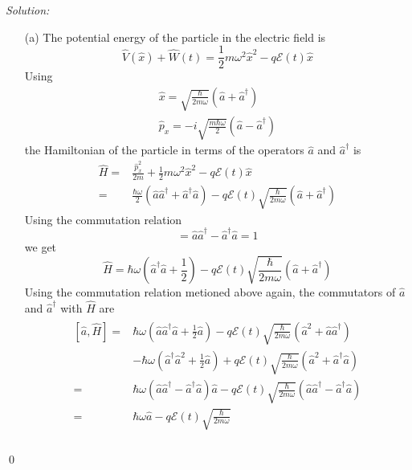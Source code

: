 \documentclass[12pt,a4paper]{article}
\newenvironment{sol}
    {\emph{Solution:}
    }
    {
    \qed
    }
\begin{document}
\begin{sol}
\begin{itemize}
\item[(a)] The potential energy of the particle in the electric field is
\begin{equation}
\hat{V}(\hat{x})+\hat{W}(t)=\frac{1}{2}m\omega^2\hat{x}^2-q\mathcal{E}(t)\hat{x}
\end{equation}
Using
\begin{gather}
\hat{x}=\sqrt{\frac{\hbar}{2m\omega}}(\hat{a}+\hat{a}^{\dagger})\\
\hat{p}_x=-i\sqrt{\frac{m\hbar\omega}{2}}(\hat{a}-\hat{a}^{\dagger})
\end{gather}
the Hamiltonian of the particle in terms of the operators $\hat{a}$ and $\hat{a}^{\dagger}$ is
\begin{align}
\nonumber\hat{H}=&\frac{\hat{p}_x^2}{2m}+\frac{1}{2}m\omega^2\hat{x}^2-q\mathcal{E}(t)\hat{x}\\
=&\frac{\hbar\omega}{2}(\hat{a}\hat{a}^{\dagger}+\hat{a}^{\dagger}\hat{a})-q\mathcal{E}(t)\sqrt{\frac{\hbar}{2m\omega}}(\hat{a}+\hat{a}^{\dagger})
\end{align}
Using the commutation relation
\begin{equation}
[\hat{a},\hat{a}^{\dagger}]=\hat{a}\hat{a}^{\dagger}-\hat{a}^{\dagger}\hat{a}=1
\end{equation}
we get
\begin{equation}
\hat{H}=\hbar\omega(\hat{a}^{\dagger}\hat{a}+\frac{1}{2})-q\mathcal{E}(t)\sqrt{\frac{\hbar}{2m\omega}}(\hat{a}+\hat{a}^{\dagger})
\end{equation}
Using the commutation relation metioned above again, the commutators of $\hat{a}$ and $\hat{a}^{\dagger}$ with $\hat{H}$ are
\begin{gather}
\begin{align}
\nonumber[\hat{a},\hat{H}]=&\hbar\omega(\hat{a}\hat{a}^{\dagger}\hat{a}+\frac{1}{2}\hat{a})-q\mathcal{E}(t)\sqrt{\frac{\hbar}{2m\omega}}(\hat{a}^2+\hat{a}\hat{a}^{\dagger})\\
\nonumber&-\hbar\omega(\hat{a}^{\dagger}\hat{a}^2+\frac{1}{2}\hat{a})+q\mathcal{E}(t)\sqrt{\frac{\hbar}{2m\omega}}(\hat{a}^2+\hat{a}^{\dagger}\hat{a})\\
\nonumber=&\hbar\omega(\hat{a}\hat{a}^{\dagger}-\hat{a}^{\dagger}\hat{a})\hat{a}-q\mathcal{E}(t)\sqrt{\frac{\hbar}{2m\omega}}(\hat{a}\hat{a}^{\dagger}-\hat{a}^{\dagger}\hat{a})\\
=&\hbar\omega\hat{a}-q\mathcal{E}(t)\sqrt{\frac{\hbar}{2m\omega}}
\end{align}\\

\end{gather}
\end{itemize}
\end{sol}
\end{document}

